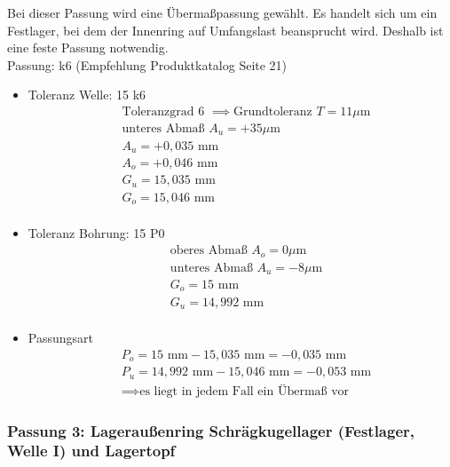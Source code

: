 Bei dieser Passung wird eine Übermaßpassung gewählt. Es handelt sich um ein Festlager, bei dem der Innenring auf Umfangslast beansprucht wird. Deshalb ist eine feste Passung notwendig. \\ 
Passung: k6 (Empfehlung Produktkatalog Seite 21)
\begin{itemize}
	\item Toleranz Welle: 15 k6
	\begin{align*}
	&\text{Toleranzgrad 6 } \implies \text{Grundtoleranz } T=11 \mu\text{m} \\
	&\text{unteres Abmaß } A_u = +35 \mu\text{m} \\
	&A_u = +0,035 \text{ mm} \\
	&A_o = +0,046 \text{ mm} \\
	&G_u = 15,035 \text{ mm} \\
	&G_o = 15,046 \text{ mm}\\
	\end{align*} 
	\item Toleranz Bohrung: 15 P0 
	\begin{align*}
	&\text{oberes Abmaß } A_o = 0 \mu\text{m} \\
	&\text{unteres Abmaß } A_u = -8 \mu\text{m} \\
	&G_o = 15 \text{ mm} \\
	&G_u = 14,992 \text{ mm}\\
	\end{align*} 
	\item Passungsart
	\begin{align*}
	&P_o = 15 \text{ mm} - 15,035 \text{ mm} = -0,035 \text{ mm} \\
	&P_u = 14,992 \text{ mm} - 15,046 \text{ mm} =-0,053 \text{ mm}\\
	&\implies \text{es liegt in jedem Fall ein Übermaß vor}
	\end{align*} 
\end{itemize}
\newpage

\subsubsection{Passung 3: Lageraußenring Schrägkugellager (Festlager, Welle I) und Lagertopf}

